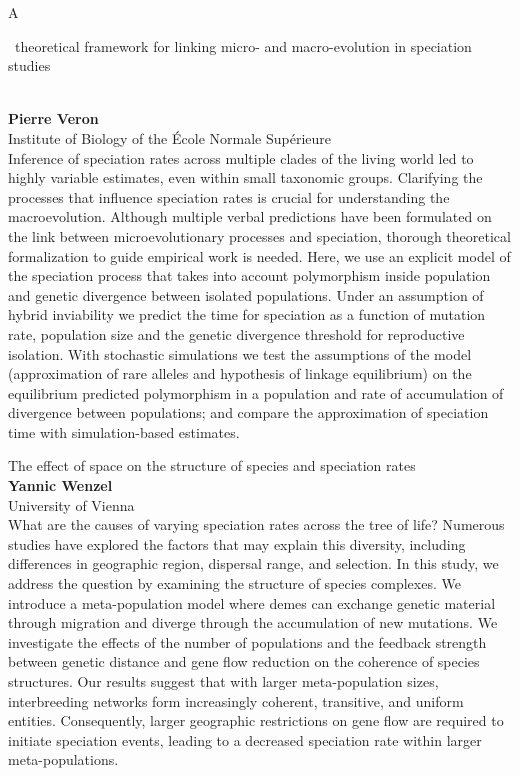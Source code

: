 \documentclass[12pt,a4paper]{article}
\newcommand{\ZAbst}{\rule[-1ex]{0pt}{2ex}\ } %
\begin{document}
\bigskip \bigskip  %
\newpage 
\noindent
{\Large A\ZAbst theoretical framework for linking micro- and macro-evolution in speciation studies}\\[1ex]
{\large 
\textbf{Pierre Veron}\\[1ex] Institute of Biology of the École Normale Supérieure}\\[2ex]
Inference of speciation rates across multiple clades of the living world led to highly variable estimates, even within small taxonomic groups. Clarifying the processes that influence speciation rates is crucial for understanding the macroevolution. Although multiple verbal predictions have been formulated on the link between microevolutionary processes and speciation, thorough theoretical formalization to guide empirical work is needed. Here, we use an explicit model of the speciation process that takes into account polymorphism inside population and genetic divergence between isolated populations. Under an assumption of hybrid inviability we predict the time for speciation as a function of mutation rate, population size and the genetic divergence threshold for reproductive isolation. With stochastic simulations we test the assumptions of the model (approximation of rare alleles and hypothesis of linkage equilibrium) on the equilibrium predicted polymorphism in a population and rate of accumulation of divergence between populations; and compare the approximation of speciation time with simulation-based estimates. 


\bigskip \bigskip  %
\noindent
{\Large The effect of space on the structure of species and speciation rates}\\[1ex]
{\large 
\textbf{Yannic Wenzel}\\[1ex] University of Vienna}\\[2ex]
What are the causes of varying speciation rates across the tree of life? Numerous studies have explored the factors that may explain this diversity, including differences in geographic region, dispersal range, and selection. In this study, we address the question by examining the structure of species complexes. We introduce a meta-population model where demes can exchange genetic material through migration and diverge through the accumulation of new mutations. We investigate the effects of the number of populations and the feedback strength between genetic distance and gene flow reduction on the coherence of species structures. Our results suggest that with larger meta-population sizes, interbreeding networks form increasingly coherent, transitive, and uniform entities. Consequently, larger geographic restrictions on gene flow are required to initiate speciation events, leading to a decreased speciation rate within larger meta-populations.
\end{document}
